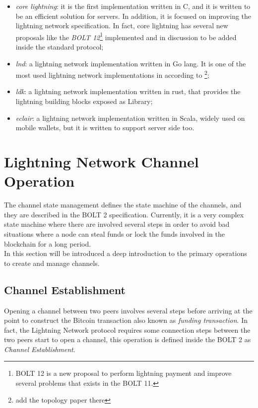 \begin{itemize}
  \item \emph{core lightning}: it is the first implementation written in C, and it is written
        to be an efficient solution for servers. In addition, it is focused on improving the lightning network specification. In fact, core lightning has several new proposals like the \emph{BOLT 12}\footnote{BOLT 12 is a new proposal to perform
        lightning payment and improve several problems that exists in the BOLT 11.} implemented and in discussion to be
        added inside the standard protocol;
  \item \emph{lnd}: a lightning network implementation written in Go lang. It is one of the most used lightning network implementations in according to \footnote{add the topology paper there};
  \item \emph{ldk}: a lightning network implementation written in rust, that provides the lightning building blocks exposed as Library;
  \item \emph{eclair}: a lightning network implementation written in Scala, widely used on mobile wallets, but it is written to
        support server side too.
\end{itemize}

\section{Lightning Network Channel Operation}
\label{sec:channel_state}

The channel state management defines the state machine of the channels, and they are described in the BOLT 2 specification. Currently, it is a very complex
state machine where there are involved several steps in order to avoid bad
situations where a node can steal funds or lock the funds involved in the blockchain for a long period.\\
In this section will be introduced a deep introduction to the primary operations to create and manage channels.

\subsection{Channel Establishment}
\label{sec:open_a_channels}

Opening a channel between two peers involves several steps before arriving at the point to construct the Bitcoin transaction also
known as \emph{funding transaction}.
In fact, the Lightning Network protocol requires some connection steps between the two peers start to open a channel, this
operation is defined inside the BOLT 2\cite{bolt2} as \emph{Channel Establishment}.

